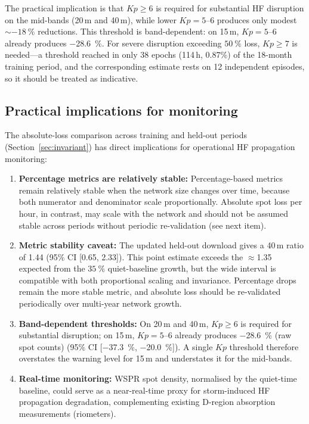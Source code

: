 \documentclass{agujournal2019}
\begin{document}
The practical implication is that $Kp \ge 6$ is required for substantial HF
disruption on the mid-bands (20\,m and 40\,m), while lower
$Kp = 5\text{--}6$ produces only modest $\sim\SI{-18}{\percent}$ reductions.
This threshold is band-dependent: on 15\,m, $Kp = 5\text{--}6$ already
produces \SI{-28.6}{\percent}. For severe disruption exceeding
$\SI{50}{\percent}$ loss, $Kp \ge 7$ is needed---a threshold reached in only
38 epochs (114\,h, 0.87\%) of the 18-month training period, and the
corresponding estimate rests on 12 independent episodes, so it should be
treated as indicative.

\subsection{Practical implications for monitoring}

The absolute-loss comparison across training and held-out periods (Section~\ref{sec:invariant}) has direct implications for operational HF propagation monitoring:

\begin{enumerate}
	\item \textbf{Percentage metrics are relatively stable:} Percentage-based
	      metrics remain relatively stable when the network size changes
	      over time, because both numerator and denominator scale
	      proportionally. Absolute spot loss per hour, in contrast, may
	      scale with the network and should not be assumed stable across
	      periods without periodic re-validation (see next item).
	\item \textbf{Metric stability caveat:} The updated held-out download
	      gives a 40\,m ratio of 1.44 (95\% CI [0.65, 2.33]). This point
	      estimate exceeds the $\approx$1.35 expected from the
	      $\SI{+35}{\percent}$ quiet-baseline growth, but the wide interval
	      is compatible with both proportional scaling and invariance.
	      Percentage drops remain the more stable metric, and absolute loss
	      should be re-validated periodically over multi-year network growth.
	\item \textbf{Band-dependent thresholds:} On 20\,m and 40\,m,
	      $Kp \ge 6$ is required for substantial disruption; on 15\,m,
	      $Kp = 5\text{--}6$ already produces \SI{-28.6}{\percent} (raw spot counts)
	      (95\% CI [\SI{-37.3}{\percent}, \SI{-20.0}{\percent}]). A single
	      $Kp$ threshold therefore overstates the warning level for 15\,m
	      and understates it for the mid-bands.
	\item \textbf{Real-time monitoring:} WSPR spot density, normalised by the
	      quiet-time baseline, could serve as a near-real-time proxy for
	      storm-induced HF propagation degradation, complementing existing
	      D-region absorption measurements (riometers).
\end{enumerate}
\end{document}
